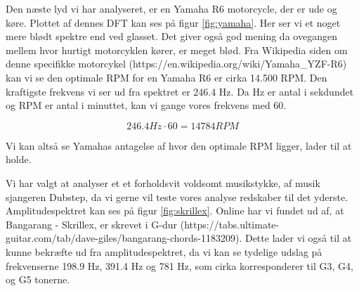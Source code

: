 \documentclass[../main.tex]{subfiles}
\begin{document}
Den næste lyd vi har analyseret, er en Yamaha R6 motorcycle, der er ude og køre. Plottet af dennes DFT kan ses på figur \ref{fig:yamaha}. Her ser vi et noget mere blødt spektre end ved glasset. Det giver også god mening da ovegangen mellem hvor hurtigt motorcyklen kører, er meget blød. Fra Wikipedia siden om denne specifikke motorcykel (https://en.wikipedia.org/wiki/Yamaha\_YZF-R6) kan vi se den optimale RPM for en Yamaha R6 er cirka 14.500 RPM. Den kraftigste frekvens vi ser ud fra spektret er 246.4 Hz. Da Hz er antal i sekdundet og RPM er antal i minuttet, kan vi gange vores frekvens med 60.

\[246.4 Hz \cdot 60 = 14784 RPM\]

Vi kan altså se Yamahas antagelse af hvor den optimale RPM ligger, lader til at holde.


Vi har valgt at analyser et et forholdsvit voldsomt musikstykke, af musik sjangeren Dubstep, da vi gerne vil teste vores analyse redskaber til det yderste. Amplitudespektret kan ses på figur \ref{fig:skrillex}. Online har vi fundet ud af, at Bangarang - Skrillex, er skrevet i G-dur (https://tabs.ultimate-guitar.com/tab/dave-giles/bangarang-chords-1183209). Dette lader vi også til at kunne bekræfte ud fra amplitudespektret, da vi kan se tydelige udslag på frekvenserne 198.9 Hz, 391.4 Hz og 781 Hz, som cirka korresponderer til G3, G4, og G5 tonerne. 
\end{document}
